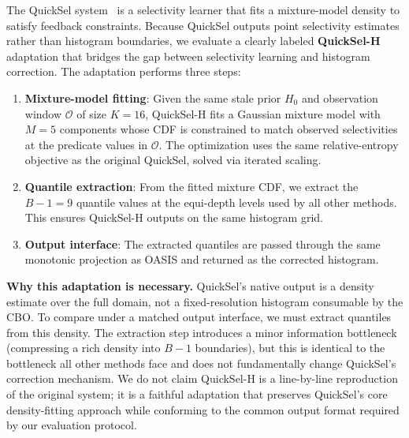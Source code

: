 The QuickSel system~\cite{park2020quicksel} is a selectivity learner that fits a
mixture-model density to satisfy feedback constraints. Because QuickSel outputs
point selectivity estimates rather than histogram boundaries, we evaluate a
clearly labeled \textbf{QuickSel-H} adaptation that bridges the gap between
selectivity learning and histogram correction. The adaptation performs three steps:

\begin{enumerate}
  \item \textbf{Mixture-model fitting}: Given the same stale prior $H_0$ and
        observation window $\mathcal{O}$ of size $K{=}16$, QuickSel-H fits a
        Gaussian mixture model with $M{=}5$ components whose CDF is constrained
        to match observed selectivities at the predicate values in $\mathcal{O}$.
        The optimization uses the same relative-entropy objective as the original
        QuickSel, solved via iterated scaling.
  \item \textbf{Quantile extraction}: From the fitted mixture CDF, we extract
        the $B{-}1{=}9$ quantile values at the equi-depth levels used by all other
        methods. This ensures QuickSel-H outputs on the same histogram grid.
  \item \textbf{Output interface}: The extracted quantiles are passed through
        the same monotonic projection as OASIS and returned as the corrected histogram.
\end{enumerate}

\noindent\textbf{Why this adaptation is necessary.}
QuickSel's native output is a density estimate over the full domain, not a
fixed-resolution histogram consumable by the CBO. To compare under a matched
output interface, we must extract quantiles from this density. The extraction
step introduces a minor information bottleneck (compressing a rich density into
$B{-}1$ boundaries), but this is identical to the bottleneck all other methods
face and does not fundamentally change QuickSel's correction mechanism. We do
not claim QuickSel-H is a line-by-line reproduction of the original system; it
is a faithful adaptation that preserves QuickSel's core density-fitting approach
while conforming to the common output format required by our evaluation protocol.
